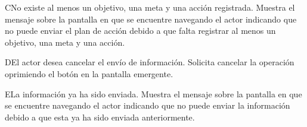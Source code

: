   \begin{UCtrayectoriaA}{C}{No existe al menos un objetivo, una meta y una acción registrada.}
    \UCpaso[\UCsist] Muestra el mensaje  sobre la pantalla en que se encuentre navegando el actor  indicando que no puede enviar el plan de acción debido a que falta registrar al menos un objetivo, una meta y una acción. 
 \end{UCtrayectoriaA}
 
     \begin{UCtrayectoriaA}{D}{El actor desea cancelar el envío de información.}
    \UCpaso[\UCactor] Solicita cancelar la operación oprimiendo el botón  en la pantalla emergente.
    \end{UCtrayectoriaA}
    
     \begin{UCtrayectoriaA}{E}{La información ya ha sido enviada.}
    \UCpaso[\UCsist] Muestra el mensaje  sobre la pantalla en que se encuentre navegando el actor indicando que no puede enviar la información debido a que esta ya ha sido enviada anteriormente. 
    \end{UCtrayectoriaA}